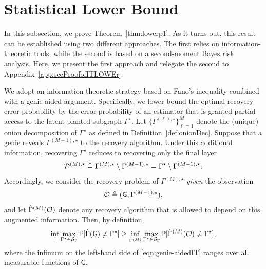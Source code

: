 \documentclass[12pt]{article}
\newcommand {\pr} {\mathbb{P}}
\newcommand{\calD}{{\cal D}}
\newcommand{\calO}{{\cal O}}
\newcommand{\calS}{{\cal S}}
\newcommand{\s}[1]{\mathsf{#1}}
\begin{document}
\section{Statistical Lower Bound}\label{sec:lowerbounds}

In this subsection, we prove Theorem~\ref{thm:lowerp1}. As it turns out, this result can be established using two different approaches. The first relies on information-theoretic tools, while the second is based on a second-moment Bayes risk analysis. Here, we present the first approach and relegate the second to Appendix~\ref{app:secProofofITLOWEr}.

We adopt an information-theoretic strategy based on Fano's inequality combined with a genie-aided argument. Specifically, we lower bound the optimal recovery error probability by the error probability of an estimator that is granted partial access to the latent planted subgraph $\Gamma^\star$. Let $\{\Gamma^{(\ell),\star}\}_{\ell=1}^M$ denote the (unique) onion decomposition of $\Gamma^\star$ as defined in Definition~\ref{def:onionDec}. Suppose that a genie reveals $\Gamma^{(M-1),\star}$ to the recovery algorithm. Under this additional information, recovering $\Gamma^\star$ reduces to recovering only the final layer
\begin{align}
\calD^{(M),\star}\triangleq \Gamma^{(M),\star}\setminus\Gamma^{(M-1),\star}
= \Gamma^\star\setminus\Gamma^{(M-1),\star}.
\end{align}
Accordingly, we consider the recovery problem of $\Gamma^{(M),\star}$ \emph{given} the observation
\begin{align}
\calO\triangleq(\s{G},\Gamma^{(M-1),\star}),
\end{align}
and let $\hat{\Gamma}^{(M)}(\calO)$ denote any recovery algorithm that is allowed to depend on this augmented information. Then, by definition,
\begin{align}
    \inf_{\hat{\Gamma}}\max_{\Gamma^\star\in\calS_{\Gamma}}\pr[\hat{\Gamma}(\s{G})\neq\Gamma^\star]
    \geq
    \inf_{\hat{\Gamma}^{(M)}}\max_{\Gamma^\star\in\calS_{\Gamma}}\pr[\hat{\Gamma}^{(M)}(\calO)\neq\Gamma^{\star}],
    \label{eqn:genie-aidedIT}
\end{align}
where the infimum on the left-hand side of \eqref{eqn:genie-aidedIT} ranges over all measurable functions of $\s{G}$.
\end{document}
